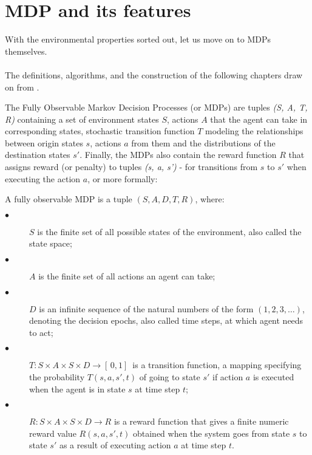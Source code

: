 \section{MDP and its features}
With the environmental properties sorted out, let us move on to MDPs themselves. 
\\ 
\\
The definitions, algorithms, and the construction of the following chapters draw on from \cite{Kolobov2012}. 

The Fully Observable Markov Decision Processes (or MDPs) are tuples \emph{(S, A, T, R)} containing a set of environment states $S$, actions $A$ that the agent can take in corresponding states, stochastic transition function $T$ modeling the relationships between origin states $s$, actions $a$ from them and the distributions of the destination states $s'$. Finally, the MDPs also contain the reward function $R$ that assigns reward (or penalty) to tuples \emph{(s, a, s')} - for transitions from $s$ to $s'$ when executing the action $a$, or more formally:

\newpage
\begin{definition}\label{def:MDP}
A fully observable MDP is a tuple $(S, A, D, T, R)$, where:
\begin{description}
  \item[$\bullet$ ] $S$ is the finite set of all possible states of the environment, also called the state space;
  \item[$\bullet$ ] $A$ is the finite set of all actions an agent can take;
  \item[$\bullet$ ] $D$ is an infinite sequence of the natural numbers of the form $(1, 2, 3, \ldots)$, denoting the decision epochs, also called time steps, at which agent needs to act;
  \item[$\bullet$ ] $T : S \times A \times S \times D \rightarrow [ \,0, 1] \,$ is a transition function, a mapping specifying the probability $T(s, a, s', t)$ of going to state $s'$ if action $a$ is executed when the agent is in state $s$ at time step $t$;
  \item[$\bullet$ ] $R : S \times A \times S \times D \rightarrow R$ is a reward function that gives a finite numeric reward value $R(s, a, s', t)$ obtained when the system goes from state $s$ to state $s'$ as a result of executing action $a$ at time step $t$.
\end{description}
\end{definition}


